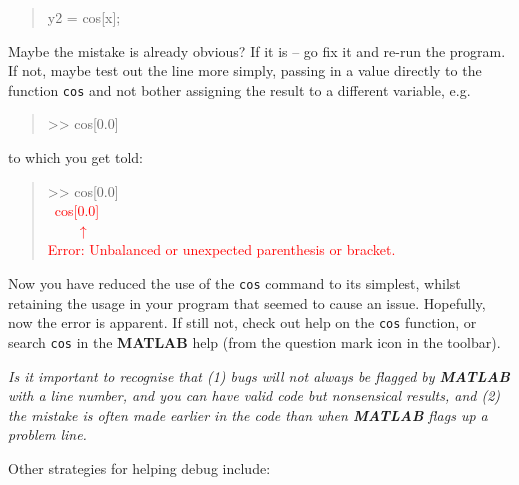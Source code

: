 \documentclass{tufte-book} %
\newenvironment{docspec}{\begin{quotation}\ttfamily\parskip0pt\parindent0pt\ignorespaces}{\end{quotation}}
\begin{document}
\begin{docspec}
y2 = cos[x];
\end{docspec} 

\noindent Maybe the mistake is already obvious? If it is -- go fix it and re-run the program. If not, maybe test out the line more simply, passing in a value directly to the function \texttt{cos} and not bother assigning the result to a different variable, e.g.

\begin{docspec}
>> cos[0.0]
\end{docspec} 

\noindent to which you get told:

\begin{docspec}
>> cos[0.0]
\textcolor{red}{\\ \ cos[0.0]
\\ \ \ \ \ \(\uparrow\)
\\Error: Unbalanced or unexpected parenthesis or bracket.}
\end{docspec} 

\noindent Now you have reduced the use of the \texttt{\texttt{cos}} command to its simplest, whilst retaining the usage in your program that seemed to cause an issue. Hopefully, now the error is apparent. If still not, check out help on the \texttt{cos} function, or search \texttt{cos} in the \textbf{MATLAB} help (from the question mark icon in the toolbar).

\textit{Is it important to recognise that (1) bugs will not always be flagged by \textbf{MATLAB} with a line number, and you can have valid code but nonsensical results, and (2) the mistake is often made earlier in the code than when \textbf{MATLAB} flags up a problem line.} 

Other strategies for helping debug include:
\end{document}
